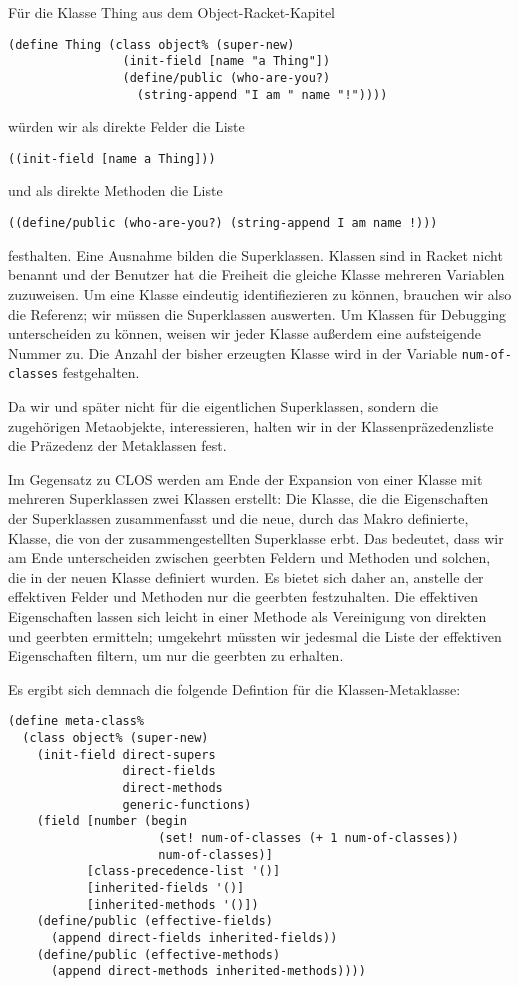 Für die Klasse Thing aus dem Object-Racket-Kapitel

\begin{lstlisting}
(define Thing (class object% (super-new)
                (init-field [name "a Thing"])
                (define/public (who-are-you?) 
                  (string-append "I am " name "!"))))
\end{lstlisting}

würden wir als direkte Felder die Liste 

\texttt{{\textquotesingle}((init-field [name {\qq}a Thing\qq]))} 

und als direkte Methoden die Liste 

\texttt{{\textquotesingle}((define/public (who-are-you?) (string-append {\qq}I am {\qq} name \qq!\qq)))} 

festhalten. Eine Ausnahme bilden die Superklassen. Klassen sind in Racket nicht benannt und der Benutzer hat die Freiheit die gleiche Klasse mehreren Variablen zuzuweisen. Um eine Klasse eindeutig identifiezieren zu können, brauchen wir also die Referenz; wir müssen die Superklassen auswerten. Um Klassen für Debugging unterscheiden zu können, weisen wir jeder Klasse außerdem eine aufsteigende Nummer zu. Die Anzahl der bisher erzeugten Klasse wird in der Variable \texttt{num-of-classes} festgehalten.

Da wir und später nicht für die eigentlichen Superklassen, sondern die zugehörigen Metaobjekte, interessieren, halten wir in der Klassenpräzedenzliste die Präzedenz der Metaklassen fest.

Im Gegensatz zu CLOS werden am Ende der Expansion von einer Klasse mit mehreren Superklassen zwei Klassen erstellt: Die Klasse, die die Eigenschaften der Superklassen zusammenfasst und die neue, durch das Makro definierte, Klasse, die von der zusammengestellten Superklasse erbt. Das bedeutet, dass wir am Ende unterscheiden zwischen geerbten Feldern und Methoden und solchen, die in der neuen Klasse definiert wurden. Es bietet sich daher an, anstelle der effektiven Felder und Methoden nur die geerbten festzuhalten. Die effektiven Eigenschaften lassen sich leicht in einer Methode als Vereinigung von direkten und geerbten ermitteln; umgekehrt müssten wir jedesmal die Liste der effektiven Eigenschaften filtern, um nur die geerbten zu erhalten. 

Es ergibt sich demnach die folgende Defintion für die Klassen-Metaklasse:

\begin{lstlisting}
(define meta-class%
  (class object% (super-new)
    (init-field direct-supers
                direct-fields
                direct-methods
                generic-functions)
    (field [number (begin 
                     (set! num-of-classes (+ 1 num-of-classes))
                     num-of-classes)]
           [class-precedence-list '()]
           [inherited-fields '()]
           [inherited-methods '()])    
    (define/public (effective-fields)
      (append direct-fields inherited-fields))
    (define/public (effective-methods)
      (append direct-methods inherited-methods))))
\end{lstlisting}

